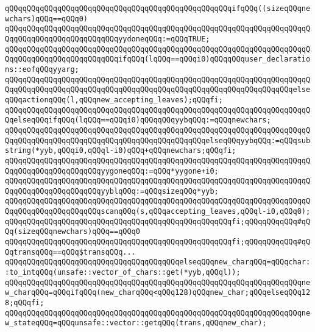 \verb|qQQqqQQqqQQqqQQqqQQqqQQqqQQqqQQqqQQqqQQqqQQqqQQqqQQqifqQQq((sizeqQQqnewchars)qQQq==qQQq0)|\newline
\verb|qQQqqQQqqQQqqQQqqQQqqQQqqQQqqQQqqQQqqQQqqQQqqQQqqQQqqQQqqQQqqQQqqQQqqQQqqQQqqQQqqQQqqQQqqQQqqQQqyydoneqQQq:=qQQqTRUE;|\newline
\verb|qQQqqQQqqQQqqQQqqQQqqQQqqQQqqQQqqQQqqQQqqQQqqQQqqQQqqQQqqQQqqQQqqQQqqQQqqQQqqQQqqQQqqQQqqQQqqQQqifqQQq(lqQQq==qQQqi0)qQQqqQQquser_declarations::eofqQQqyyarg;|\newline
\verb|qQQqqQQqqQQqqQQqqQQqqQQqqQQqqQQqqQQqqQQqqQQqqQQqqQQqqQQqqQQqqQQqqQQqqQQqqQQqqQQqqQQqqQQqqQQqqQQqqQQqqQQqqQQqqQQqqQQqqQQqqQQqqQQqqQQqqQQqelseqQQqactionqQQq(l,qQQqnew_accepting_leaves);qQQqfi;|\newline
\verb|qQQqqQQqqQQqqQQqqQQqqQQqqQQqqQQqqQQqqQQqqQQqqQQqqQQqqQQqqQQqqQQqqQQqqQQqelseqQQqifqQQq(lqQQq==qQQqi0)qQQqqQQqyybqQQq:=qQQqnewchars;|\newline
\verb|qQQqqQQqqQQqqQQqqQQqqQQqqQQqqQQqqQQqqQQqqQQqqQQqqQQqqQQqqQQqqQQqqQQqqQQqqQQqqQQqqQQqqQQqqQQqqQQqqQQqqQQqqQQqqQQqqQQqelseqQQqyybqQQq:=qQQqsubstring(*yyb,qQQqi0,qQQql-i0)qQQq+qQQqnewchars;qQQqfi;|\newline
\verb|qQQqqQQqqQQqqQQqqQQqqQQqqQQqqQQqqQQqqQQqqQQqqQQqqQQqqQQqqQQqqQQqqQQqqQQqqQQqqQQqqQQqqQQqqQQqyygoneqQQq:=qQQq*yygone+i0;|\newline
\verb|qQQqqQQqqQQqqQQqqQQqqQQqqQQqqQQqqQQqqQQqqQQqqQQqqQQqqQQqqQQqqQQqqQQqqQQqqQQqqQQqqQQqqQQqqQQqyyblqQQq:=qQQqsizeqQQq*yyb;|\newline
\verb|qQQqqQQqqQQqqQQqqQQqqQQqqQQqqQQqqQQqqQQqqQQqqQQqqQQqqQQqqQQqqQQqqQQqqQQqqQQqqQQqqQQqqQQqqQQqscanqQQq(s,qQQqaccepting_leaves,qQQql-i0,qQQq0);|\newline
\verb|qQQqqQQqqQQqqQQqqQQqqQQqqQQqqQQqqQQqqQQqqQQqqQQqqQQqfi;qQQqqQQqqQQq#qQQq(sizeqQQqnewchars)qQQq==qQQq0|\newline
\verb|qQQqqQQqqQQqqQQqqQQqqQQqqQQqqQQqqQQqqQQqqQQqqQQqqQQqfi;qQQqqQQqqQQq#qQQqtransqQQq==qQQq$transqQQq...|\newline
\verb|qQQqqQQqqQQqqQQqqQQqqQQqqQQqqQQqqQQqqQQqelseqQQqnew_charqQQq=qQQqchar::to_intqQQq(unsafe::vector_of_chars::get(*yyb,qQQql));|\newline
\verb|qQQqqQQqqQQqqQQqqQQqqQQqqQQqqQQqqQQqqQQqqQQqqQQqqQQqqQQqqQQqqQQqqQQqnew_charqQQq=qQQqifqQQq(new_charqQQq<qQQq128)qQQqnew_char;qQQqelseqQQq128;qQQqfi;|\newline
\verb|qQQqqQQqqQQqqQQqqQQqqQQqqQQqqQQqqQQqqQQqqQQqqQQqqQQqqQQqqQQqqQQqqQQqnew_stateqQQq=qQQqunsafe::vector::getqQQq(trans,qQQqnew_char);|\newline
